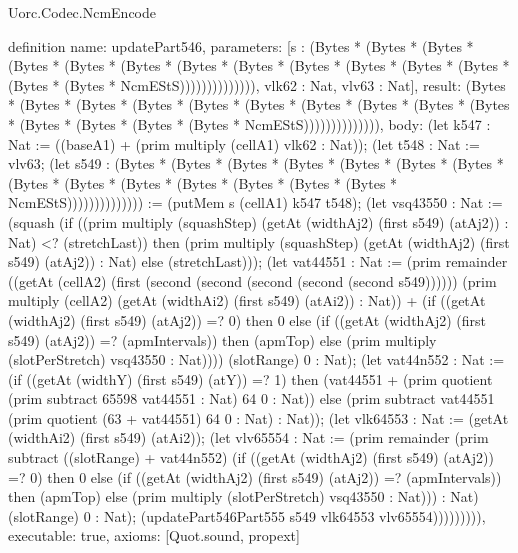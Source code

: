 \begin{lexlean}{Uorc.Codec.NcmEncode}
\begin{semanticmodule}
definition{
  name: updatePart546,
  parameters: [s : (Bytes * (Bytes * (Bytes * (Bytes * (Bytes * (Bytes * (Bytes * (Bytes * (Bytes * (Bytes * (Bytes * (Bytes * (Bytes * (Bytes * NcmEStS)))))))))))))), vlk62 : Nat, vlv63 : Nat],
  result: (Bytes * (Bytes * (Bytes * (Bytes * (Bytes * (Bytes * (Bytes * (Bytes * (Bytes * (Bytes * (Bytes * (Bytes * (Bytes * (Bytes * NcmEStS)))))))))))))),
  body: (let k547 : Nat := ((baseA1) + (prim multiply (cellA1) vlk62 : Nat)); (let t548 : Nat := vlv63; (let s549 : (Bytes * (Bytes * (Bytes * (Bytes * (Bytes * (Bytes * (Bytes * (Bytes * (Bytes * (Bytes * (Bytes * (Bytes * (Bytes * (Bytes * NcmEStS)))))))))))))) := (putMem s (cellA1) k547 t548); (let vsq43550 : Nat := (squash (if ((prim multiply (squashStep) (getAt (widthAj2) (first s549) (atAj2)) : Nat) <? (stretchLast)) then (prim multiply (squashStep) (getAt (widthAj2) (first s549) (atAj2)) : Nat) else (stretchLast))); (let vat44551 : Nat := (prim remainder ((getAt (cellA2) (first (second (second (second (second (second s549)))))) (prim multiply (cellA2) (getAt (widthAi2) (first s549) (atAi2)) : Nat)) + (if ((getAt (widthAj2) (first s549) (atAj2)) =? 0) then 0 else (if ((getAt (widthAj2) (first s549) (atAj2)) =? (apmIntervals)) then (apmTop) else (prim multiply (slotPerStretch) vsq43550 : Nat)))) (slotRange) 0 : Nat); (let vat44n552 : Nat := (if ((getAt (widthY) (first s549) (atY)) =? 1) then (vat44551 + (prim quotient (prim subtract 65598 vat44551 : Nat) 64 0 : Nat)) else (prim subtract vat44551 (prim quotient (63 + vat44551) 64 0 : Nat) : Nat)); (let vlk64553 : Nat := (getAt (widthAi2) (first s549) (atAi2)); (let vlv65554 : Nat := (prim remainder (prim subtract ((slotRange) + vat44n552) (if ((getAt (widthAj2) (first s549) (atAj2)) =? 0) then 0 else (if ((getAt (widthAj2) (first s549) (atAj2)) =? (apmIntervals)) then (apmTop) else (prim multiply (slotPerStretch) vsq43550 : Nat))) : Nat) (slotRange) 0 : Nat); (updatePart546Part555 s549 vlk64553 vlv65554))))))))),
  executable: true,
  axioms: [Quot.sound, propext]
}


\end{semanticmodule}
\end{lexlean}
